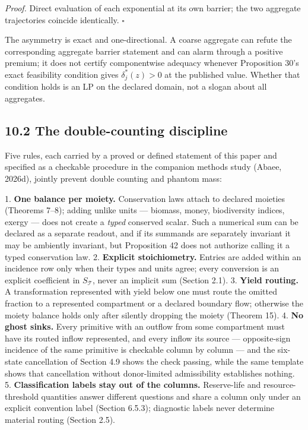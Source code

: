 \documentclass[11pt]{article}
\begin{document}
\emph{Proof.} Direct evaluation of each exponential at its own barrier; the two aggregate trajectories coincide identically. \(\square\)

The asymmetry is exact and one-directional. A coarse aggregate can refute the corresponding aggregate barrier statement and can alarm through a positive premium; it does not certify componentwise adequacy whenever Proposition 30's exact feasibility condition gives \(\delta^{*}_j(z)>0\) at the published value. Whether that condition holds is an LP on the declared domain, not a slogan about all aggregates.

\subsection*{10.2 The double-counting discipline}\label{102-the-double-counting-discipline}

Five rules, each carried by a proved or defined statement of this paper and specified as a checkable procedure in the companion methods study (Abaee, 2026d), jointly prevent double counting and phantom mass:

1. \textbf{One balance per moiety.} Conservation laws attach to declared moieties (Theorems 7--8); adding unlike units --- biomass, money, biodiversity indices, exergy --- does not create a \emph{typed} conserved scalar. Such a numerical sum can be declared as a separate readout, and if its summands are separately invariant it may be ambiently invariant, but Proposition 42 does not authorize calling it a typed conservation law. 2. \textbf{Explicit stoichiometry.} Entries are added within an incidence row only when their types and units agree; every conversion is an explicit coefficient in \(S_{\mathcal{T}}\), never an implicit sum (Section 2.1). 3. \textbf{Yield routing.} A transformation represented with yield below one must route the omitted fraction to a represented compartment or a declared boundary flow; otherwise the moiety balance holds only after silently dropping the moiety (Theorem 15). 4. \textbf{No ghost sinks.} Every primitive with an outflow from some compartment must have its routed inflow represented, and every inflow its source --- opposite-sign incidence of the same primitive is checkable column by column --- and the six-state cancellation of Section 4.9 shows the check passing, while the same template shows that cancellation without donor-limited admissibility establishes nothing. 5. \textbf{Classification labels stay out of the columns.} Reserve-life and resource-threshold quantities answer different questions and share a column only under an explicit convention label (Section 6.5.3); diagnostic labels never determine material routing (Section 2.5).
\end{document}
